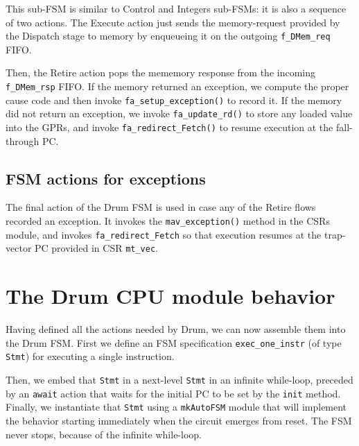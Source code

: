This sub-FSM is similar to Control and Integers sub-FSMs: it is also a
sequence of two actions.  The Execute action just sends the
memory-request provided by the Dispatch stage to memory by enqueueing
it on the outgoing \verb|f_DMem_req| FIFO.


Then, the Retire action pops the mememory response from the incoming
\verb|f_DMem_rsp| FIFO.  If the memory returned an exception, we
compute the proper cause code and then invoke
\verb|fa_setup_exception()| to record it.  If the memory did not
return an exception, we invoke \verb|fa_update_rd()| to store any
loaded value into the GPRs, and invoke \verb|fa_redirect_Fetch()| to
resume execution at the fall-through PC.



\subsection{FSM actions for exceptions}

The final action of the Drum FSM is used in case any of the Retire
flows recorded an exception.  It invokes the \verb|mav_exception()|
method in the CSRs module, and invokes \verb|fa_redirect_Fetch| so
that execution resumes at the trap-vector PC provided in CSR
\verb|mt_vec|.



\section{The Drum CPU module behavior}

\label{Sec_Drum_CPU_module_behavior}


Having defined all the actions needed by Drum, we can now assemble
them into the Drum FSM.  First we define an FSM specification
\verb|exec_one_instr| (of type \verb|Stmt|) for executing a single
instruction.

Then, we embed that \verb|Stmt| in a next-level
\verb|Stmt| in an infinite while-loop, preceded by an \verb|await|
action that waits for the initial PC to be set by the \verb|init|
method. Finally, we instantiate that \verb|Stmt| using a
\verb|mkAutoFSM| module that will implement the behavior starting
immediately when the circuit emerges from reset.  The FSM never stops,
because of the infinite while-loop.

